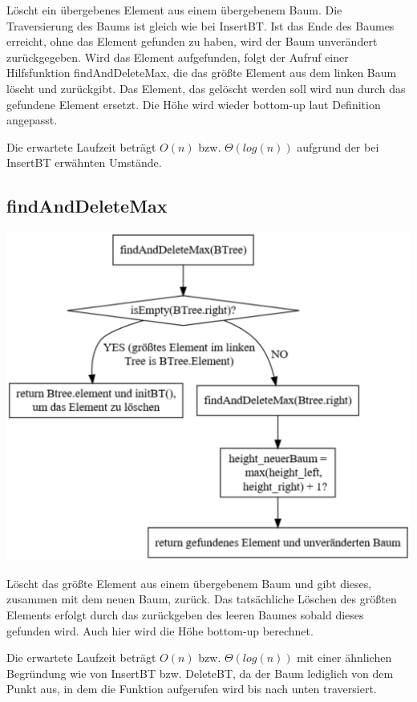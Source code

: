 \documentclass[11pt]{article}
\begin{document}
    Löscht ein übergebenes Element aus einem übergebenem Baum.
    Die Traversierung des Baums ist gleich wie bei InsertBT.
    Ist das Ende des Baumes erreicht, ohne das Element gefunden zu haben,
    wird der Baum unverändert zurückgegeben.
    Wird das Element aufgefunden, folgt der Aufruf einer Hilfsfunktion findAndDeleteMax,
    die das größte Element aus dem linken Baum löscht und zurückgibt.
    Das Element, das gelöscht werden soll wird nun durch das gefundene Element ersetzt.
    Die Höhe wird wieder bottom-up laut Definition angepasst.

    Die erwartete Laufzeit beträgt
    \begin{math}
        O(n)
    \end {math}
    bzw.
    \begin{math}
        \Theta (log (n))
    \end{math}
    aufgrund der bei InsertBT erwähnten Umstände.
    
    
    \subsection{findAndDeleteMax}\label{subsec:findanddeletemax}

    \begin{center}
        \includegraphics[width=0.65\columnwidth] {findanddeletemax.pdf}
    \end{center}

    Löscht das größte Element aus einem übergebenem Baum und gibt dieses,
    zusammen mit dem neuen Baum, zurück.
    Das tatsächliche Löschen des größten Elements erfolgt durch das zurückgeben des leeren Baumes sobald dieses gefunden wird. Auch hier wird die Höhe bottom-up berechnet.

    Die erwartete Laufzeit beträgt
    \begin{math}
        O(n)
    \end {math}
    bzw.
    \begin{math}
        \Theta (log (n))
    \end{math}
    mit einer ähnlichen Begründung wie von InsertBT bzw. DeleteBT, da der Baum lediglich von dem Punkt aus, in dem die Funktion aufgerufen wird bis nach unten traversiert.
    
\end{document}
